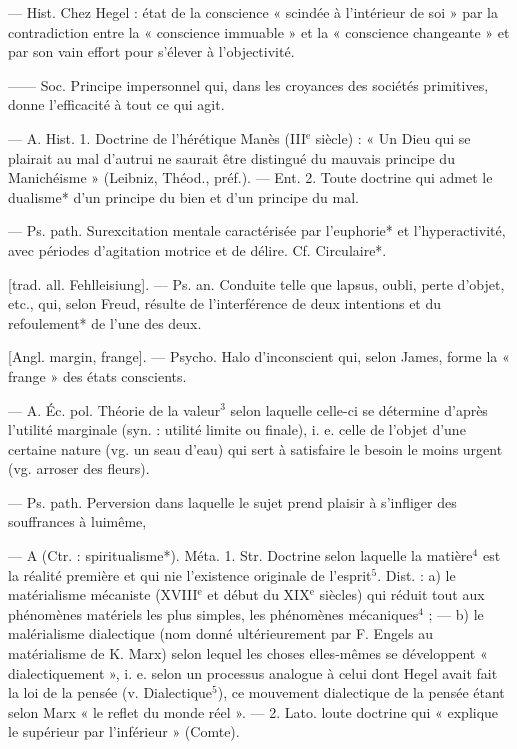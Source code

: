 \begin{itemize}[leftmargin=1cm, label=, itemsep=1pt]
 — Hist.
Chez Hegel : état de la conscience
« scindée à l'intérieur de soi » par la
contradiction entre la « conscience
immuable » et la « conscience changeante » et par son vain effort pour
s’élever à l’objectivité.

 —— Soc. Principe impersonnel
qui, dans les croyances des sociétés
primitives, donne l'efficacité à tout
ce qui agit.

 — A. Hist. 1. Doctrine
de l’hérétique Manès ({\footnotesize III}$^\text{e}$ siècle) :
« Un Dieu qui se plairait au mal
d'autrui ne saurait être distingué du
mauvais principe du Manichéisme »
(Leibniz, Théod., préf.). — Ent. 2.
Toute doctrine qui admet le dualisme* d’un principe du bien et
d’un principe du mal.

 — Ps. path. Surexcitation
mentale caractérisée par l'euphorie*
et l’hyperactivité, avec périodes
d’agitation motrice et de délire. Cf.
Circulaire*.

 [trad. all. Fehlleisiung].
— Ps. an. Conduite telle que lapsus,
oubli, perte d'objet, etc., qui, selon
Freud, résulte de l'interférence de
deux intentions et du refoulement*
de l’une des deux.

 [Angl. margin,
frange]. — Psycho. Halo d’inconscient qui, selon James, forme la
« frange » des états conscients.

 — A. Éc. pol. Théorie
de la valeur$^3$ selon laquelle celle-ci
se détermine d’après l'utilité marginale (syn. : utilité limite ou finale),
i. e. celle de l’objet d'une certaine
nature (vg. un seau d’eau) qui sert
à satisfaire le besoin le moins urgent
(vg. arroser des fleurs).

 — Ps. path. Perversion
dans laquelle le sujet prend plaisir
à s'infliger des souffrances à luimême,

 — A (Ctr. : spiritualisme*). Méta. 1. Str. Doctrine
selon laquelle la matière$^4$ est la
réalité première et qui nie l'existence originale de l'esprit$^5$. Dist. :
a) le matérialisme mécaniste ({\footnotesize XVIII}$^\text{e}$
et début du {\footnotesize XIX}$^\text{e}$ siècles) qui réduit
tout aux phénomènes matériels les
plus simples, les phénomènes mécaniques$^4$ ; — b) le malérialisme dialectique (nom donné ultérieurement
par F. Engels au matérialisme de
K. Marx) selon lequel les choses
elles-mêmes se développent « dialectiquement », i. e. selon un processus analogue à celui dont Hegel
avait fait la loi de la pensée (v. Dialectique$^5$), ce mouvement dialectique
de la pensée étant selon Marx
« le reflet du monde réel ». — 2. Lato.
loute doctrine qui « explique le
supérieur par l’inférieur » (Comte).


\end{itemize}
